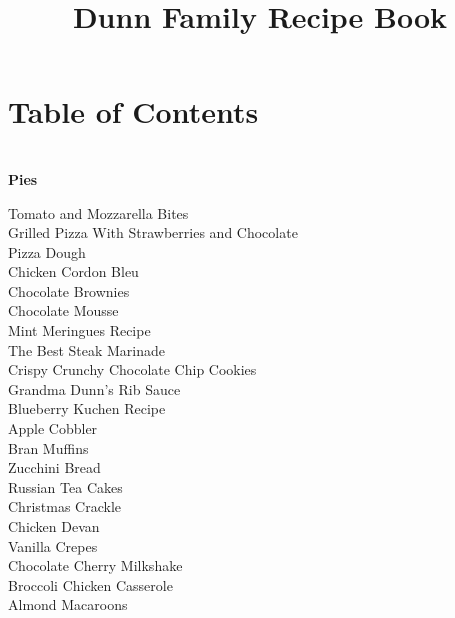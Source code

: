\documentclass[11pt, twoside, openany]{book}
\title{ \LARGE \textbf{Dunn Family Recipe Book}}
\begin{document}
\maketitle
\section*{Table of Contents}
{\\\Large \textbf{Pies}}\hfill\textbf{\pageref{pies}}

Tomato and Mozzarella Bites\hrulefill\pageref{tomato-and-mozzarella-bites}\\
Grilled Pizza With Strawberries and Chocolate\hrulefill\pageref{grilled-pizza-with-strawberries-and-chocolate}\\
Pizza Dough\hrulefill\pageref{pizza-dough}\\
Chicken Cordon Bleu\hrulefill\pageref{chicken-cordon-bleu}\\
Chocolate Brownies\hrulefill\pageref{chocolate-brownies}\\
Chocolate Mousse\hrulefill\pageref{chocolate-mousse}\\
Mint Meringues Recipe\hrulefill\pageref{mint-meringues-recipe}\\
The Best Steak Marinade\hrulefill\pageref{the-best-steak-marinade}\\
Crispy Crunchy Chocolate Chip Cookies\hrulefill\pageref{crispy-crunchy-chocolate-chip-cookies}\\
Grandma Dunn's Rib Sauce\hrulefill\pageref{grandma-dunn's-rib-sauce}\\
Blueberry Kuchen Recipe\hrulefill\pageref{blueberry-kuchen-recipe}\\
Apple Cobbler\hrulefill\pageref{apple-cobbler}\\
Bran Muffins\hrulefill\pageref{bran-muffins}\\
Zucchini Bread\hrulefill\pageref{zucchini-bread}\\
Russian Tea Cakes\hrulefill\pageref{russian-tea-cakes}\\
Christmas Crackle\hrulefill\pageref{christmas-crackle}\\
Chicken Devan\hrulefill\pageref{chicken-devan}\\
Vanilla Crepes\hrulefill\pageref{vanilla-crepes}\\
Chocolate Cherry Milkshake\hrulefill\pageref{chocolate-cherry-milkshake}\\
Broccoli Chicken Casserole\hrulefill\pageref{broccoli-chicken-casserole}\\
Almond Macaroons\hrulefill\pageref{almond-macaroons}\\
\end{document}
